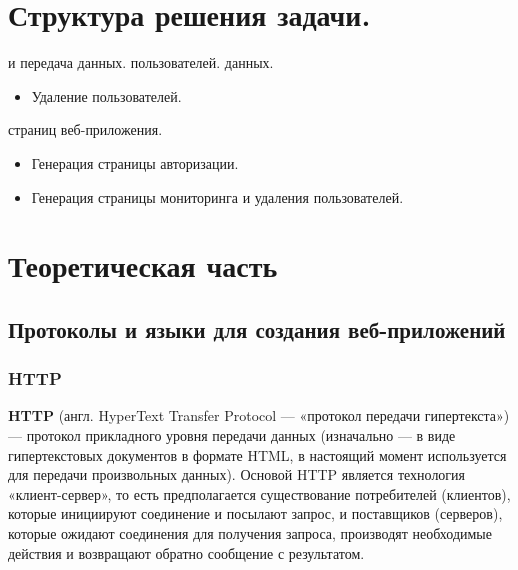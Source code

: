 \documentclass[a4paper]{article}
\begin{document}


\section{Структура решения задачи.}

\begin{enumerate}
 и передача данных.
 пользователей.
 данных.
\begin{itemize}
 нового пользователя в приложении.
 нового сообщения.
 сообщений.
\item Удаление пользователей.
\end{itemize}
 страниц веб-приложения.
\begin{itemize}
 главной страницы.
 страницы регистрации.
\item Генерация страницы авторизации.
\item Генерация страницы мониторинга и удаления пользователей.
\end{itemize}
\end{enumerate}


\section{Теоретическая часть}

\subsection{Протоколы и языки для создания веб-приложений}

\subsubsection{HTTP}

\textbf{HTTP} (англ. HyperText Transfer Protocol — «протокол передачи гипертекста») — протокол прикладного уровня передачи данных (изначально — в виде гипертекстовых документов в формате HTML, в настоящий момент используется для передачи произвольных данных). Основой HTTP является технология «клиент-сервер», то есть предполагается существование потребителей (клиентов), которые инициируют соединение и посылают запрос, и поставщиков (серверов), которые ожидают соединения для получения запроса, производят необходимые действия и возвращают обратно сообщение с результатом.
\end{document}
